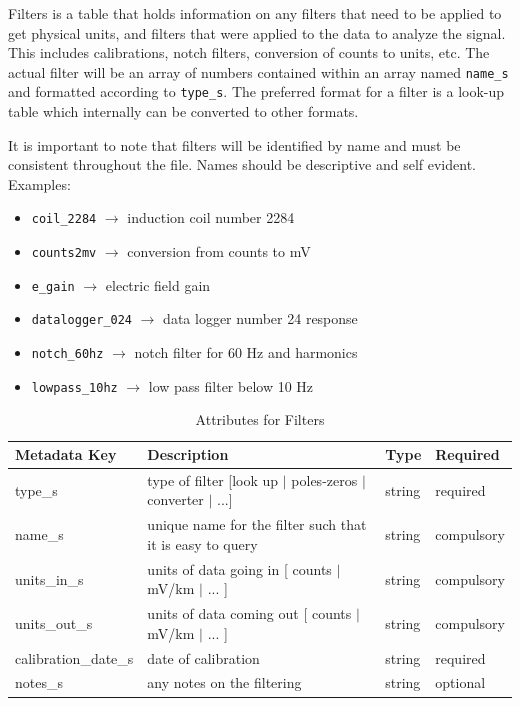 \documentclass{article}
\begin{document}
Filters is a table that holds information on any filters that need to be applied to get physical units, and filters that were applied to the data to analyze the signal.  This includes calibrations, notch filters, conversion of counts to units, etc. The actual filter will be an array of numbers contained within an array named \verb|name_s| and formatted according to \verb|type_s|. The preferred format for a filter is a look-up table which internally can be converted to other formats.  

It is important to note that filters will be identified by name and must be consistent throughout the file. Names should be descriptive and self evident. Examples:
\begin{itemize}
	\item \verb|coil_2284| $\longrightarrow$ induction coil number 2284
	\item \verb|counts2mv| $\longrightarrow$ conversion from counts to mV
	\item \verb|e_gain| $\longrightarrow$ electric field gain 
	\item \verb|datalogger_024| $\longrightarrow$ data logger number 24 response
	\item \verb|notch_60hz| $\longrightarrow$ notch filter for 60 Hz and harmonics
	\item \verb|lowpass_10hz| $\longrightarrow$ low pass filter below 10 Hz
\end{itemize}

\begin{table}[htb!]
	\caption[Attributes for Filter]{Attributes for Filters}
	\begin{tabular}{|l|p{3.5in}|l|l|}
		\hline
		\textbf{Metadata Key} & \textbf{Description} & \textbf{Type} & \textbf{Required} \\ \hline
		type\_s & type of filter [look up $|$ poles-zeros $|$ converter $|$ ...]& string &  required \\ \hline
		name\_s & unique name for the filter such that it is easy to query & string & compulsory \\ \hline
		units\_in\_s & units of data going in [ counts $|$ mV/km $|$ ... ] & string & compulsory \\ \hline
		units\_out\_s & units of data coming out [ counts $|$ mV/km $|$ ... ] & string & compulsory \\ \hline
		calibration\_date\_s & date of calibration & string &  required \\ \hline
		notes\_s & any notes on the filtering & string &  optional \\ \hline
	\end{tabular}
	\label{tab:filter}
\end{table}
\end{document}
